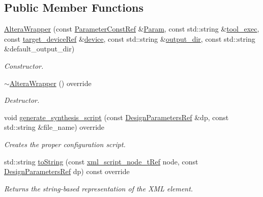 \subsection*{Public Member Functions}
\begin{DoxyCompactItemize}
\item 
\hyperlink{classAlteraWrapper_a14be514ee813d96f8022ddd04db156e4}{Altera\+Wrapper} (const \hyperlink{Parameter_8hpp_a37841774a6fcb479b597fdf8955eb4ea}{Parameter\+Const\+Ref} \&\hyperlink{classSynthesisTool_a854ef102782ff4d069e1aa6d1a94d64e}{Param}, const std\+::string \&\hyperlink{classSynthesisTool_a78fd58496215c69838de4269204804a5}{tool\+\_\+exec}, const \hyperlink{target__device_8hpp_acedb2b7a617e27e6354a8049fee44eda}{target\+\_\+device\+Ref} \&\hyperlink{classSynthesisTool_a07bf37421c6cff80ba70682ea2b2e3ae}{device}, const std\+::string \&\hyperlink{classSynthesisTool_a285793f6f539ed6f049c375cdb68d607}{output\+\_\+dir}, const std\+::string \&default\+\_\+output\+\_\+dir)
\begin{DoxyCompactList}\small\item\em Constructor. \end{DoxyCompactList}\item 
\hyperlink{classAlteraWrapper_afaddee368c66861d44ec787942fb49f6}{$\sim$\+Altera\+Wrapper} () override
\begin{DoxyCompactList}\small\item\em Destructor. \end{DoxyCompactList}\item 
void \hyperlink{classAlteraWrapper_adf412338b1dab2382e24b261cbe6c216}{generate\+\_\+synthesis\+\_\+script} (const \hyperlink{DesignParameters_8hpp_ae36bb1c4c9150d0eeecfe1f96f42d157}{Design\+Parameters\+Ref} \&dp, const std\+::string \&file\+\_\+name) override
\begin{DoxyCompactList}\small\item\em Creates the proper configuration script. \end{DoxyCompactList}\item 
std\+::string \hyperlink{classAlteraWrapper_a0e6e4558b643ccd1ba0179c4e5d470d8}{to\+String} (const \hyperlink{xml__script__command_8hpp_a1fe3d50ade66bc35e41be9b68bbbcd02}{xml\+\_\+script\+\_\+node\+\_\+t\+Ref} node, const \hyperlink{DesignParameters_8hpp_ae36bb1c4c9150d0eeecfe1f96f42d157}{Design\+Parameters\+Ref} dp) const override
\begin{DoxyCompactList}\small\item\em Returns the string-\/based representation of the X\+ML element. \end{DoxyCompactList}\item 

\end{DoxyCompactItemize}
